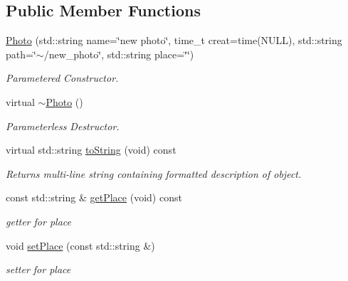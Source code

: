 \subsection*{Public Member Functions}
\begin{DoxyCompactItemize}
\item 
\hypertarget{classPhoto_a77533515f74784f105299a7fe911833a}{\hyperlink{classPhoto_a77533515f74784f105299a7fe911833a}{Photo} (std\-::string name=\char`\"{}new photo\char`\"{}, time\-\_\-t creat=time(N\-U\-L\-L), std\-::string path=\char`\"{}$\sim$/new\-\_\-photo\char`\"{}, std\-::string place=\char`\"{}\char`\"{})}\label{classPhoto_a77533515f74784f105299a7fe911833a}

\begin{DoxyCompactList}\small\item\em Parametered Constructor. \end{DoxyCompactList}\item 
virtual \hyperlink{classPhoto_adc366234be6226600360c7cbba8e7fcf}{$\sim$\-Photo} ()
\begin{DoxyCompactList}\small\item\em Parameterless Destructor. \end{DoxyCompactList}\item 
\hypertarget{classPhoto_a8be4be2bb68b6db13ec45ff3bed71481}{virtual std\-::string \hyperlink{classPhoto_a8be4be2bb68b6db13ec45ff3bed71481}{to\-String} (void) const }\label{classPhoto_a8be4be2bb68b6db13ec45ff3bed71481}

\begin{DoxyCompactList}\small\item\em Returns multi-\/line string containing formatted description of object. \end{DoxyCompactList}\item 
\hypertarget{classPhoto_a310123a0d107ab078bc83a80b484e2c1}{const std\-::string \& \hyperlink{classPhoto_a310123a0d107ab078bc83a80b484e2c1}{get\-Place} (void) const }\label{classPhoto_a310123a0d107ab078bc83a80b484e2c1}

\begin{DoxyCompactList}\small\item\em getter for place \end{DoxyCompactList}\item 
\hypertarget{classPhoto_ae835a7d23db2b2f6b90d1efaaf034959}{void \hyperlink{classPhoto_ae835a7d23db2b2f6b90d1efaaf034959}{set\-Place} (const std\-::string \&)}\label{classPhoto_ae835a7d23db2b2f6b90d1efaaf034959}

\begin{DoxyCompactList}\small\item\em setter for place \end{DoxyCompactList}\end{DoxyCompactItemize}



